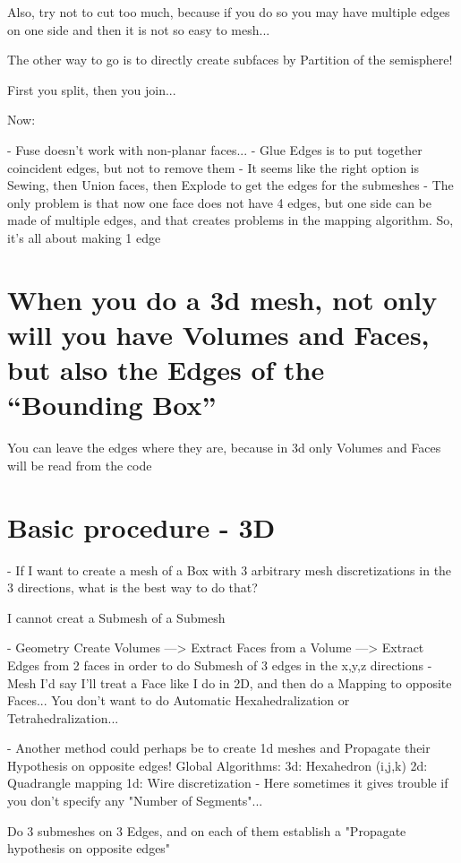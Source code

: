 \documentclass[10pt]{book}
\begin{document}
  Also, try not to cut too much, because if you do so you may have multiple edges on one side and then it is not so easy to mesh...
 
 The other way to go is to directly create subfaces by Partition of the semisphere!
 
 First you split, then you join...
 
 Now:
 
 - Fuse doesn't work with non-planar faces...
 - Glue Edges is to put together coincident edges, but not to remove them
 - It seems like the right option is Sewing, then Union faces, then Explode to get the edges for the submeshes
 - The only problem is that now one face does not have 4 edges, but one side can be made of multiple edges,
   and that creates problems in the mapping algorithm. So, it's all about making 1 edge
   
\section{When you do a 3d mesh, not only will you have Volumes and Faces, but also the Edges of the ``Bounding Box''}

  You can leave the edges where they are, because in 3d only Volumes and Faces will be read from the code
 

\section{Basic procedure - 3D}


- If I want to create a mesh of a Box with 3 arbitrary mesh discretizations in the 3 directions,
  what is the best way to do that?
  

I cannot creat a Submesh of a Submesh

- Geometry
  Create Volumes
    ---> Extract Faces from a Volume
    ---> Extract Edges from 2 faces in order to do Submesh of 3 edges in the x,y,z directions
- Mesh 
  I'd say I'll treat a Face like I do in 2D, and then do a Mapping to opposite Faces...
  You don't want to do Automatic Hexahedralization or Tetrahedralization...
  
- Another method could perhaps be to create 1d meshes and Propagate their Hypothesis on opposite edges!
  Global Algorithms:
    3d: Hexahedron (i,j,k)
    2d: Quadrangle mapping
    1d: Wire discretization  - Here sometimes it gives trouble if you don't specify any "Number of Segments"...
    
    Do 3 submeshes on 3 Edges, and on each of them establish a "Propagate hypothesis on opposite edges"
    
\end{document}
